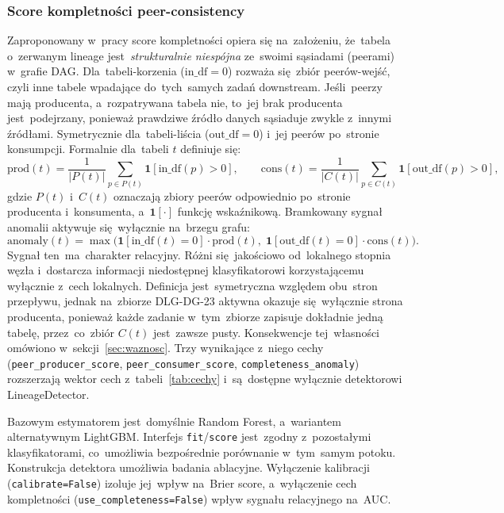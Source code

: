 \subsubsection{Score kompletności peer-consistency}

Zaproponowany w~pracy score kompletności opiera się na~założeniu,
że~tabela o~zerwanym lineage jest~\emph{strukturalnie niespójna}
ze~swoimi sąsiadami (peerami) w~grafie DAG. Dla~tabeli-korzenia
($\mathrm{in\_df} = 0$) rozważa się~zbiór peerów-wejść, czyli inne tabele
wpadające do~tych~samych zadań downstream. Jeśli~peerzy mają
producenta, a~rozpatrywana tabela nie, to~jej brak producenta jest~podejrzany,
ponieważ prawdziwe źródło danych sąsiaduje zwykle z~innymi źródłami. Symetrycznie
dla~tabeli-liścia ($\mathrm{out\_df} = 0$) i~jej peerów po~stronie konsumpcji.
Formalnie dla~tabeli $t$ definiuje się:
%
\[
  \mathrm{prod}(t) = \frac{1}{|P(t)|}\sum_{p \in P(t)} \mathbf{1}[\mathrm{in\_df}(p) > 0],
  \qquad
  \mathrm{cons}(t) = \frac{1}{|C(t)|}\sum_{p \in C(t)} \mathbf{1}[\mathrm{out\_df}(p) > 0],
\]
%
gdzie $P(t)$ i~$C(t)$ oznaczają zbiory peerów odpowiednio po~stronie
producenta i~konsumenta, a~$\mathbf{1}[\cdot]$ funkcję wskaźnikową.
Bramkowany sygnał anomalii aktywuje się~wyłącznie na~brzegu grafu:
%
\[
  \mathrm{anomaly}(t) =
  \max\bigl(\mathbf{1}[\mathrm{in\_df}(t)=0]\cdot\mathrm{prod}(t),\;
            \mathbf{1}[\mathrm{out\_df}(t)=0]\cdot\mathrm{cons}(t)\bigr).
\]
%
Sygnał ten~ma~charakter relacyjny. Różni się~jakościowo od~lokalnego
stopnia węzła i~dostarcza informacji niedostępnej klasyfikatorowi
korzystającemu wyłącznie z~cech lokalnych. Definicja jest~symetryczna
względem obu~stron przepływu, jednak na~zbiorze DLG-DG-23 aktywna
okazuje się~wyłącznie strona producenta, ponieważ każde zadanie w~tym~zbiorze
zapisuje dokładnie jedną tabelę, przez~co~zbiór $C(t)$ jest~zawsze pusty.
Konsekwencje tej~własności omówiono w~sekcji~\ref{sec:waznosc}. Trzy wynikające z~niego cechy
(\texttt{peer\_producer\_score}, \texttt{peer\_consumer\_score},
\texttt{completeness\_anomaly}) rozszerzają wektor cech z~tabeli~\ref{tab:cechy}
i~są~dostępne wyłącznie detektorowi LineageDetector.

Bazowym estymatorem jest~domyślnie Random Forest, a~wariantem
alternatywnym LightGBM. Interfejs \texttt{fit}/\texttt{score} jest~zgodny z~pozostałymi
klasyfikatorami, co~umożliwia bezpośrednie porównanie w~tym~samym potoku.
Konstrukcja detektora umożliwia badania ablacyjne. Wyłączenie kalibracji
(\texttt{calibrate=False}) izoluje jej~wpływ na~Brier score, a~wyłączenie
cech kompletności (\texttt{use\_completeness=False}) wpływ sygnału
relacyjnego na~AUC.

